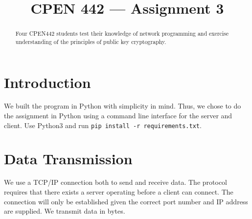 \documentclass[conference]{IEEEtran}
\begin{document}
\title{CPEN 442 --- Assignment 3}


\author{
\and
{}
}


\maketitle

\begin{abstract}
Four CPEN442 students test their knowledge of network programming and exercise understanding of the principles of public key cryptography. 
\end{abstract}



\section{Introduction}
We built the program in Python with simplicity in mind. Thus, we chose to do the assignment in Python using a command line interface for the server and client. Use Python3 and run {\tt pip install -r requirements.txt}.

\section{Data Transmission}
We use a TCP/IP connection both to send and receive data. The protocol requires that there exists a server operating before a client can connect. The connection will only be established given the correct port number and IP address are supplied. We transmit data in bytes. 
\end{document}
